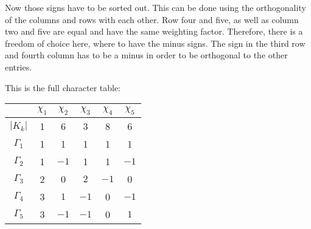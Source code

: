 \documentclass[11pt, english, fleqn, DIV=15, headinclude, BCOR=1cm]{scrartcl}
\begin{document}
Now those signs have to be sorted out. This can be done using the orthogonality
of the columns and rows with each other. Row four and five, as well as column
two and five are equal and have the same weighting factor. Therefore, there is
a freedom of choice here, where to have the minus signs. The sign in the third
row and fourth column has to be a minus in order to be orthogonal to the other
entries.

This is the full character table:

\begin{tabular}{c|ccccc}
    & $\chi_1$ & $\chi_2$ & $\chi_3$ & $\chi_4$ & $\chi_5$ \\
    \midrule
    $|K_k|$ & 1 & 6 & 3 & 8 & 6 \\
    \midrule
    $\Gamma_1$ & 1 & 1 & 1 & 1 & 1 \\
    $\Gamma_2$ & 1 & $-1$ & 1 & 1 & $-1$ \\
    $\Gamma_3$ & 2 & 0 & $2$ & $- 1$ & 0 \\
    $\Gamma_4$ & 3 & $1$ & $-1$ & 0 & $-1$ \\
    $\Gamma_5$ & 3 & $-1$ & $-1$ & 0 & $1$ \\
\end{tabular}
\end{document}
